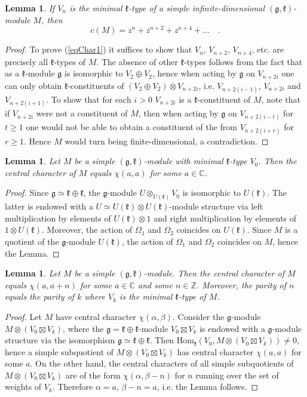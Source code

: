 \documentclass[12pt]{amsart}
\theoremstyle{plain} %
\newtheorem{lemma}[definition]{Lemma}
\renewcommand{\hom}{\mathrm{Hom}}
\newcommand {\ZZ} {\mathbb {Z}}
\newcommand {\CC} {\mathbb {C}}
\newcommand{\kk}{\mathfrak{k}}
\renewcommand{\gg}{\mathfrak{g}}
\newcommand{\refeq}[1]{(\ref{#1})}
\begin{document}
\begin{lemma}\label{lmch}
If $V_n$ is the minimal $\kk$-type of a simple infinite-dimensional $(\gg,\kk)$-module $M$, then
\begin{equation}\label{eqChar1}
c(M)=z^n+z^{n+2}+z^{n+4}+\dots\quad .
\end{equation}
\end{lemma}
\begin{proof}
To prove \refeq{eqChar1} it suffices to show that $V_n$, $V_{n+2}$,
$V_{n+4}$, etc. are precisely all $\kk$-types of $M$. The absence of
other $\kk$-types follows from the fact that as a $\kk$-module $\gg$
is isomorphic to $V_2\oplus V_2$, hence when acting by $\gg$ on
$V_{n+2i}$ one can only obtain $\kk$-constituents of $(V_2\oplus
V_2)\otimes V_{n+2i}$, i.e. $V_{n+2(i-1)}$, $V_{n+2i}$ and
$V_{n+2(i+1)}$. To show that for each $i>0$ $V_{n+2i}$ is a
$\kk$-constituent of $M$, note that if $V_{n+2i}$ were not a
constituent of $M$, then  when acting by $\gg$ on $V_{n+2(i-t)}$ for $t\geq 1$ one would not be able to obtain a constituent of the from $V_{n+2(i+r)}$ for $r\geq 1$. Hence $M$ would turn being finite-dimensional, a contradiction.
\end{proof}

\begin{lemma}
Let $M$ be a simple $(\gg,\kk)$-module with minimal $\kk$-type $V_0$. Then the central character of $M$ equals $\chi(a,a)$ for some $a\in \CC$.
\end{lemma}
\begin{proof}
Since $\gg\simeq \kk\oplus\kk$, the $\gg$-module  $U\otimes_{U(\kk)}V_0$ is isomorphic to $U(\kk)$. The latter is endowed with a $U\simeq U(\kk)\otimes U(\kk)$-module structure via left multiplication by elements of $U(\kk)\otimes 1$ and right
 multiplication by elements of $1\otimes U(\kk)$.
Moreover, the action of $\Omega_1$ and $\Omega_2$ coincides on $U(\kk)$. Since $M$ is a quotient of the $\gg$-module $U(\kk)$, the action of $\Omega_1$ and $\Omega_2$ coincides on $M$, hence the Lemma.
\end{proof}
\begin{lemma}
Let $M$ be a simple $(\gg,\kk)$-module. Then the central character of $M$ equals $\chi (a,a+n)$ for some $a\in \CC$ and some $n\in\ZZ$. Moreover, the parity of $n$ equals the parity of $k$ where $V_k$ is the minimal $\kk$-type of $M$.
\end{lemma}
\begin{proof}
Let $M$ have central character $\chi(\alpha,\beta)$.
Consider the $\gg$-module $M\otimes (V_0\boxtimes V_k)$, where
the $\gg=\kk\oplus\kk$-module
$V_0\boxtimes V_k$ is endowed with a $\gg$-module structure via
the isomorphism $\gg\simeq \kk\oplus\kk$. Then
$\hom_\kk(V_0,M\otimes(V_0\boxtimes V_k))\neq 0$, hence a simple
subquotient of $M\otimes (V_0\boxtimes V_k)$ has central character
$\chi (a,a)$ for some $a$. On the other hand, the central characters
of all simple subquotients of $M\otimes(V_0\boxtimes V_k)$ are of the
form $\chi(\alpha,\beta-n)$ for $n$ running over the set of weights of
$V_k$.
Therefore $\alpha=a$, $\beta-n=a$, i.e. the Lemma follows.
\end{proof}
\end{document}
